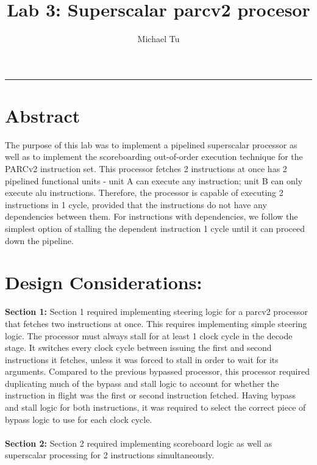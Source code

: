 \documentclass[a4paper, 12pt]{article}
\begin{document}
\title{\vspace*{-.9in}Lab 3: Superscalar parcv2 procesor}
\author{Michael Tu}
\maketitle
\hrule

\section{Abstract}
The purpose of this lab was to implement a pipelined superscalar processor as well as to implement the scoreboarding out-of-order execution technique for the PARCv2 instruction set. This processor fetches 2 instructions at once has 2 pipelined functional units - unit A can execute any instruction; unit B can only execute alu instructions. Therefore, the processor is capable of executing 2 instructions in 1 cycle, provided that the instructions do not have any dependencies between them. For instructions with dependencies, we follow the simplest option of stalling the dependent instruction 1 cycle until it can proceed down the pipeline.

\section{Design Considerations:}
\textbf{Section 1:} Section 1 required implementing steering logic for a parcv2 processor that fetches two instructions at once. This requires implementing simple steering logic. The processor must always stall for at least 1 clock cycle in the decode stage. It switches every clock cycle between issuing the first and second instructions it fetches, unless it was forced to stall in order to wait for its arguments. Compared to the previous bypassed processor, this processor required duplicating much of the bypass and stall logic to account for whether the instruction in flight was the first or second instruction fetched. Having bypass and stall logic for both instructions, it was required to select the correct piece of bypass logic to use for each clock cycle.
\\ \\
\textbf{Section 2:} Section 2 required implementing scoreboard logic as well as superscalar processing for 2 instructions simultaneously. 
\end{document}
